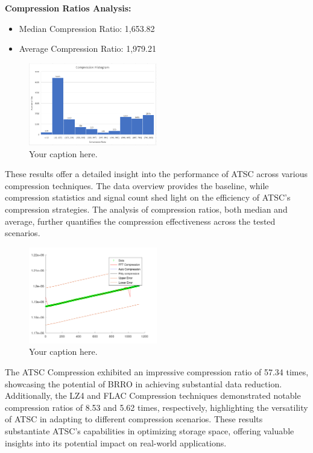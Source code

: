 \documentclass[conference]{IEEEtran}
\begin{document}
\textbf{Compression Ratios Analysis:}

\begin{itemize}
    \item Median Compression Ratio: 1,653.82
    \item Average Compression Ratio: 1,979.21
\end{itemize}

\begin{figure}[h]
  \centering
  \includegraphics[width=0.5\textwidth]{Fig5.png}
  \caption{Your caption here.}
  \label{Fig.5}
\end{figure}

\vspace{10pt}
These results offer a detailed insight into the performance of ATSC across various compression techniques. The data overview provides the baseline, while compression statistics and signal count shed light on the efficiency of ATSC's compression strategies. The analysis of compression ratios, both median and average, further quantifies the compression effectiveness across the tested scenarios. 
 

\begin{figure}[h]
  \centering
  \includegraphics[width=0.5\textwidth]{Fig6.png}
  \caption{Your caption here.}
  \label{Fig.6}
\end{figure}


\vspace{10pt}
The ATSC Compression exhibited an impressive compression ratio of 57.34 times, showcasing the potential of BRRO in achieving substantial data reduction. Additionally, the LZ4 and FLAC Compression techniques demonstrated notable compression ratios of 8.53 and 5.62 times, respectively, highlighting the versatility of ATSC in adapting to different compression scenarios. 
These results substantiate ATSC's capabilities in optimizing storage space, offering valuable insights into its potential impact on real-world applications. 
\end{document}

